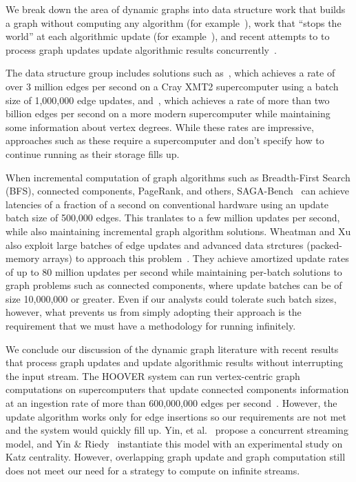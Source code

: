 We break down the area of dynamic graphs into data structure work
that builds a graph without computing any algorithm
(for example~\cite{ediger2012stinger,riedy2011tracking,pearce1}),
work that ``stops the world'' at each algorithmic update
(for
example~\cite{riedy2011tracking,saga,helen}),
and recent attempts to
to process graph updates update algorithmic results concurrently~\cite{yin2018new,yin2019concurrent,sallinen2019incremental,grossman2020hoover}.

The data structure group includes solutions such as~\cite{ediger2012stinger},
 which achieves a rate of over 3 million edges per second on a Cray
 XMT2 supercomputer using a batch size of 1,000,000 edge updates,
 and~\cite{pearce1}, which achieves a rate of more than two billion edges
 per second on a more modern supercomputer while maintaining some
 information about
 vertex degrees.  While these rates are impressive, approaches such as these
 require a supercomputer and don't specify how to continue running as
 their storage fills up.

When incremental computation of graph algorithms such as Breadth-First
Search (BFS), connected components, PageRank, and others, SAGA-Bench~\cite{saga}
can achieve latencies of a fraction of a second on conventional hardware
using an update batch size of 500,000 edges.  This tranlates to a few
million updates per second, while also maintaining incremental graph
algorithm solutions.  Wheatman and Xu also exploit large batches of edge
updates and advanced data strctures (packed-memory arrays) to approach
this problem~\cite{helen}.  They achieve amortized update rates of up to
80 million updates per second while maintaining per-batch solutions to
graph problems such as connected components, where update batches can be of
size 10,000,000 or greater.  Even if our analysts could tolerate such
batch sizes, however, what prevents us from
simply adopting their approach is the requirement that we must
have a methodology for running infinitely.

We conclude our discussion of the dynamic graph literature with recent
results that process graph updates and update algorithmic results without
interrupting the input stream. The HOOVER system can run vertex-centric
graph computations on supercomputers that update connected components
information at an ingestion rate of more than 600,000,000 edges per
second~\cite{grossman2020hoover}.  However, the update algorithm works only
for edge insertions so our requirements are not met and the system would
 quickly fill up. Yin, et al.~\cite{yin2018new} propose a concurrent streaming
 model, and Yin \& Riedy~\cite{yin2019concurrent} instantiate this model with
 an experimental study on Katz centrality.  However, overlapping graph update
 and graph computation still does not meet our need for a strategy to compute
 on infinite streams.

